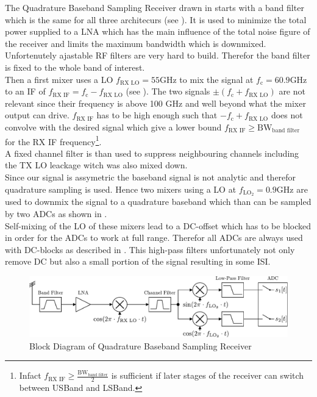 The Quadrature Baseband Sampling Receiver drawn in 
starts with a band filter which is the same for all three architecurs
(see ).
It is used to minimize the total power supplied to a \gls{LNA}
which has the main influence of the total noise figure of the receiver
and limits the maximum bandwidth which is downmixed.
Unfortenutely ajastable \gls{RF} filters are very hard to build. Therefor
the band filter is fixed to the whole band of interest. \\

Then a first mixer uses a \gls{LO} $f_{\text{RX LO}} = 55 \text{GHz}$
to mix the signal at $f_{\text{c}} = 60.9 \text{GHz}$
to an \gls{IF} of $f_{\text{RX IF}} = f_{\text{c}} - f_{\text{RX LO}}$
(see ).
The two signals $\pm (f_{\text{c}} + f_{\text{RX LO}})$ are not relevant
since their frequency is above 100 GHz and well beyond what the
mixer output can drive. $f_{\text{RX IF}}$ has to be high enough such
that $-f_{\text{c}} + f_{\text{RX LO}}$ does not convolve with the
desired signal which give a lower bound
$f_{\text{RX IF}} \geq \text{BW}_{\text{band filter}}$ for the \gls{RX}
\gls{IF} frequency\footnote{%
  Infact $f_{\text{RX IF}} \geq \frac{\text{BW}_{\text{band filter}}}{2}$
  is sufficient if later stages of the receiver can switch
  between \gls{USBand} and \gls{LSBand}.}. \\

A fixed channel filter is than used to suppress neighbouring channels
including the \gls{TX} \gls{LO} leackage witch was also mixed down. \\

Since our signal is assymetric the baseband signal is not analytic
and therefor quadrature sampling is used.
Hence two mixers using a \gls{LO} at $f_{\text{LO}_2} = 0.9 \text{GHz}$ are
used to downmix the signal to a quadrature baseband which than can
be sampled by two \glspl{ADC} as shown in . \\

Self-mixing of the \gls{LO} of these mixers lead to a \gls{DC}-offset
which has to be blocked in order for the \glspl{ADC} to work at full range.
Therefor all \glspl{ADC} are always used with \gls{DC}-blocks as described in
. This high-pass filters unfortunately
not only remove \gls{DC} but also a small portion of the signal
resulting in some \gls{ISI}. \\

\begin{figure}[ht]
  \centering
  \includegraphics[width=\textwidth]{figures/rx_0_bd}
  \caption{Block Diagram of Quadrature Baseband Sampling Receiver}
  \label{fig:rx_0_bd}
\end{figure}


